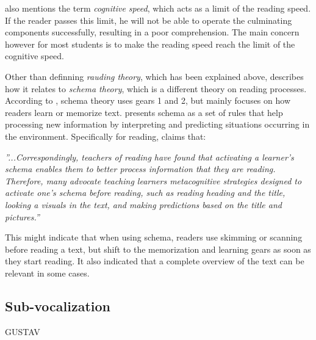 \cite{carver_reading_1992} also mentions the term \textit{cognitive speed}, which acts as a limit of the reading speed. If the reader passes this limit, he will not be able to operate the culminating components successfully, resulting in a poor comprehension. The main concern however for most students is to make the reading speed reach the limit of the cognitive speed.

Other than definning \textit{rauding theory}, which has been explained above, \cite{carver_reading_1992} describes how it relates to \textit{schema theory}, which is a different theory on reading processes. According to \cite{carver_reading_1992}, schema theory uses gears 1 and 2, but mainly focuses on how readers learn or memorize text. \cite{widmayer_schema_2005} presents schema as a set of rules that help processing new information by interpreting and predicting situations occurring in the environment. Specifically for reading, \cite{widmayer_schema_2005} claims that:

 \emph{''...Correspondingly, teachers of reading have found that activating a learner's schema enables them to better process information that they are reading. Therefore, many advocate teaching learners metacognitive strategies designed to activate one's schema before reading, such as reading heading and the title, looking a visuals in the text, and making predictions based on the title and pictures.''}

This might indicate that when using schema, readers use skimming or scanning before reading a text, but shift to the memorization and learning gears as soon as they start reading. It also indicated that a complete overview of the text can be relevant in some cases.


\subsection{Sub-vocalization}
GUSTAV
